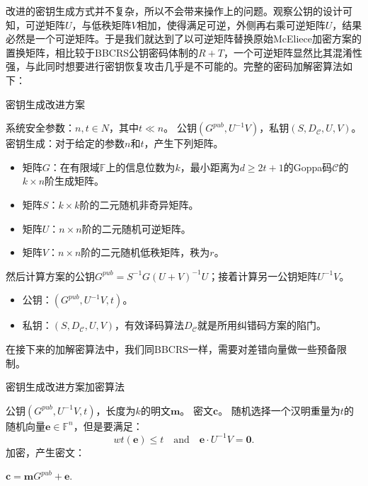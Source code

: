 改进的密钥生成方式并不复杂，所以不会带来操作上的问题。观察公钥的设计可知，可逆矩阵$U$，与低秩矩阵$V$相加，使得满足可逆，外侧再右乘可逆矩阵$U$，结果必然是一个可逆矩阵。于是我们就达到了以可逆矩阵替换原始McEliece加密方案的置换矩阵，相比较于BBCRS公钥密码体制的$R+T$，一个可逆矩阵显然比其混淆性强，与此同时想要进行密钥恢复攻击几乎是不可能的。完整的密码加解密算法如下：
\begin{breakablealgorithm}
	\small
	\renewcommand{\algorithmicrequire}{\textbf{Input:}}
	\renewcommand{\algorithmicensure}{\textbf{Output:}}
	\caption{密钥生成改进方案}
	\label{alg:NewKeyGen}
	\begin{algorithmic}[1]
		\Require
		系统安全参数：$n,t \in N$，其中$t \ll n$。
		\Ensure
		公钥$(G^{pub},U^{-1}V)$，私钥$(S,D_\mathcal{C},U,V)$。
		\State
		密钥生成：对于给定的参数$n$和$t$，产生下列矩阵。
		\begin{itemize}
			\item 矩阵$G$：在有限域$\mathbb{F}$上的信息位数为$k$，最小距离为$d \geq 2t + 1$的Goppa码$\mathcal{C}$的$k \times n$阶生成矩阵。
			\item 矩阵$S$：$k \times k$阶的二元随机非奇异矩阵。
			\item 矩阵$U$：$n \times n$阶的二元随机可逆矩阵。
			\item 矩阵$V$：$n \times n$阶的二元随机低秩矩阵，秩为$r$。
		\end{itemize}
		\State
		然后计算方案的公钥$G^{pub} = S^{-1}G(U + V)^{-1}U$；接着计算另一公钥矩阵$U^{-1}V$。
		\begin{itemize}
			\item 公钥：$(G^{pub},U^{-1}V,t)$。
			\item 私钥：$(S,D_\mathcal{C},U,V)$，有效译码算法$D_\mathcal{C}$就是所用纠错码方案的陷门。
		\end{itemize}
	\end{algorithmic}
\end{breakablealgorithm}

在接下来的加解密算法中，我们同BBCRS一样，需要对差错向量做一些预备限制。

\begin{breakablealgorithm}
	\small
	\renewcommand{\algorithmicrequire}{\textbf{Input:}}
	\renewcommand{\algorithmicensure}{\textbf{Output:}}
	\caption{密钥生成改进方案加密算法}
	\label{alg:NeweEn}
	\begin{algorithmic}[1]
		\Require
		公钥$(G^{pub},U^{-1}V,t)$，长度为$k$的明文$\mathbf{m}$。
		\Ensure
		密文$\mathbf{c}$。
		\State
		随机选择一个汉明重量为$t$的随机向量$\mathbf{e} \in \mathbb{F}^n$，但是要满足：
		\begin{equation}
			wt(\mathbf{e})\leq t\quad \mbox{and}\quad \mathbf{e}\cdot U^{-1}V = \mathbf{0}.
		\end{equation}
		\State
		加密，产生密文：
		
		\centering $\mathbf{c} = \mathbf{m}G^{pub} + \mathbf{e}.$
	\end{algorithmic}
\end{breakablealgorithm}

